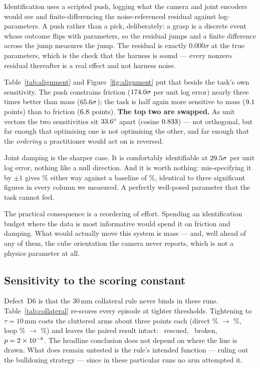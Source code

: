 \documentclass[11pt,a4paper]{article}
\newcommand{\defect}[1]{\textsc{#1}}
\begin{document}
Identification uses a scripted push, logging what the camera and joint encoders
would see and finite-differencing the noise-referenced residual against
log-parameters. A push rather than a pick, deliberately: a grasp is a discrete
event whose outcome flips with parameters, so the residual jumps and a finite
difference across the jump measures the jump. The residual is exactly
$0.000\sigma$ at the true parameters, which is the check that the harness is
sound --- every nonzero residual thereafter is a real effect and not harness
noise.

Table~\ref{tab:alignment} and Figure~\ref{fig:alignment} put that beside the
task's own sensitivity. The push constrains friction
($174.0\sigma$ per unit log error) nearly three times better
than mass ($65.6\sigma$); the task is half again more sensitive
to mass ($9.1$ points) than to friction
($6.8$ points). \textbf{The top two are swapped.} As unit
vectors the two sensitivities sit $33.6^\circ$ apart (cosine
$0.833$) --- not orthogonal, but far enough that optimising one is not
optimising the other, and far enough that the \emph{ordering} a practitioner
would act on is reversed.

Joint damping is the sharper case. It is comfortably identifiable at
$29.5\sigma$ per unit log error, nothing like a null
direction. And it is worth nothing: mis-specifying it by $\pm1$ gives
\numAlignJointdampingUp\% either way against a baseline of \numSweepZero\%,
identical to three significant figures in every column we measured. A perfectly
well-posed parameter that the task cannot feel.

The practical consequence is a reordering of effort. Spending an identification
budget where the data is most informative would spend it on friction and damping.
What would actually move this system is mass --- and, well ahead of any of them,
the cube orientation the camera never reports, which is not a physics parameter
at all.

\subsection{Sensitivity to the scoring constant}
\label{sec:collateral}

Defect~\defect{D6} is that the 30\,mm collateral rule never binds in these runs.
Table~\ref{tab:collateral} re-scores every episode at tighter thresholds.
Tightening to $\tau = 10$\,mm costs the cluttered arms about three points each
(direct \numTauThirtyClutDirect\% $\to$ \numTauTenClutDirect\%, loop
\numTauThirtyClutLoop\% $\to$ \numTauTenClutLoop\%) and leaves the paired result
intact: \numTauTenClutResc\ rescued, \numTauTenClutBroke\ broken,
$p = 2\times 10^{-8}$. The headline conclusion does not depend on where the line
is drawn. What does remain untested is the rule's intended function --- ruling out
the bulldozing strategy --- since in these particular runs no arm attempted it.
\end{document}
